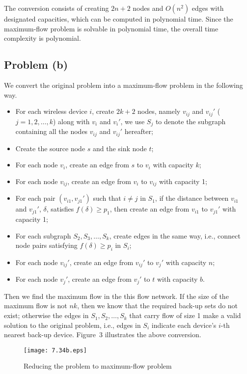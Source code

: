 \documentclass[12pt,letterpaper]{article}
\begin{document}
The conversion consists of creating $2n+2$ nodes and $O(n^2)$ edges with designated capacities, which can be computed in polynomial time. Since the maximum-flow problem is solvable in polynomial time, the overall time complexity is polynomial.

\subsection*{Problem (b)}
We convert the original problem into a maximum-flow problem in the following way.
\begin{itemize}
\item For each wireless device $i$, create $2k+2$ nodes, namely $v_{ij}$ and $v_{ij}'$ ($j = 1, 2, \dots, k$) along with $v_i$ and $v_i'$, we use $S_j$ to denote the subgraph containing all the nodes $v_{ij}$ and $v_{ij}'$ hereafter;
\item Create the source node $s$ and the sink node $t$;
\item For each node $v_i$, create an edge from $s$ to $v_i$ with capacity $k$;
\item For each node $v_{ij}$, create an edge from $v_i$ to $v_{ij}$ with capacity 1;
\item For each pair $(v_{i1}, v_{j1}')$ such that $i\ne j$ in $S_1$, if the distance between $v_{i1}$ and $v_{j1}'$, $\delta$, satisfies $f(\delta)\ge p_1$, then create an edge from $v_{i1}$ to $v_{j1}'$ with capacity 1;
\item For each subgraph $S_2, S_3, \dots, S_k$, create edges in the same way, i.e., connect node pairs satisfying $f(\delta)\ge p_i$ in $S_i$;
\item For each node $v_{ij}'$, create an edge from $v_{ij}'$ to $v_j'$ with capacity $n$;
\item For each node $v_j'$, create an edge from $v_j'$ to $t$ with capacity $b$.
\end{itemize}

Then we find the maximum flow in the this flow network. If the size of the maximum flow is not $nk$, then we know that the required back-up sets do not exist; otherwise the edges in $S_1, S_2, \dots, S_k$ that carry flow of size 1 make a valid solution to the original problem, i.e., edges in $S_i$ indicate each device's $i$-th nearest back-up device. Figure~3 illustrates the above conversion.

\begin{figure}
\begin{center}
\texttt{[image: 7.34b.eps]}
\caption{Reducing the problem to maximum-flow problem}
\end{center}
\end{figure}
\end{document}
